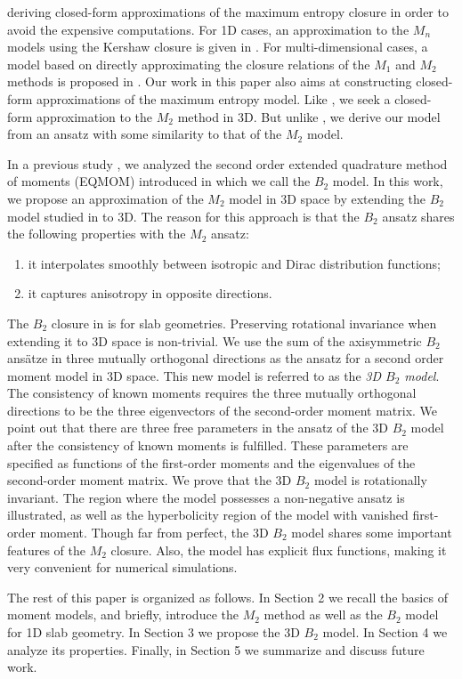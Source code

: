 deriving closed-form approximations of the maximum entropy closure in
order to avoid the expensive computations. For 1D cases, an
approximation to the $M_n$ models using the Kershaw closure is given
in \cite{schneider2016kershaw}.  For multi-dimensional cases, a model
based on directly approximating the closure relations of the $M_1$
and $M_2$ methods is proposed in \cite{pichard2016approximation}.  Our
work in this paper also aims at constructing closed-form
approximations of the maximum entropy model. Like
\cite{pichard2016approximation}, we seek a closed-form approximation
to the $M_2$ method in 3D. But unlike \cite{pichard2016approximation},
we derive our model from an ansatz with some similarity to that of the
$M_2$ model.

In a previous study \cite{alldredge2016approximating}, we analyzed the
second order extended quadrature method of moments
(EQMOM) introduced in \cite{vikas2013radiation} which we call the $B_2$
model.  
In this work, we propose an approximation of the $M_2$ model in
3D space by extending the $B_2$ model studied in
\cite{alldredge2016approximating} to 3D. The reason for this approach
is that the $B_2$ ansatz shares the following properties with the $M_2$ ansatz:
\begin{enumerate}
\item it interpolates smoothly between isotropic and Dirac
  distribution functions;
\item it captures anisotropy in opposite directions. 
\end{enumerate}
The $B_2$ closure in \cite{alldredge2016approximating} is for slab
geometries. Preserving rotational invariance when extending it to 3D
space is non-trivial. We use the sum of the axisymmetric $B_2$
ans\"atze in three mutually orthogonal directions as the ansatz for a
second order moment model in 3D space. This new model is referred to
as the {\it 3D $B_2$ model}. The consistency of known moments requires
the three mutually orthogonal directions to be the three eigenvectors
of the second-order moment matrix. We point out that there are three free
parameters in the ansatz of the 3D $B_2$ model after the consistency of 
known moments is fulfilled. These parameters are
specified as functions of the first-order moments and the eigenvalues
of the second-order moment matrix. We prove that the 3D $B_2$ model is
rotationally invariant.  The region where the model possesses a
non-negative ansatz is illustrated, as well as the hyperbolicity region of the model
with vanished first-order moment. Though far from
perfect, the 3D $B_2$ model shares some important features of the
$M_2$ closure. Also, the model has explicit flux functions, making it
very convenient for numerical simulations.


The rest of this paper is organized as follows. In Section 2 we recall
the basics of moment models, and briefly, introduce the $M_2$ method
as well as the $B_2$ model for 1D slab geometry. In Section 3 we
propose the 3D $B_2$ model. In Section 4 we analyze its
properties. Finally, in Section 5 we summarize and discuss future
work.

